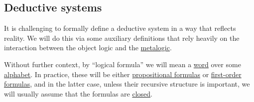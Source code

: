 \subsection{Deductive systems}\label{subsec:deductive_systems}

It is challenging to formally define a deductive system in a way that reflects reality. We will do this via some auxiliary definitions that rely heavily on the interaction between the object logic and the \hyperref[rem:metalogic]{metalogic}.

Without further context, by \enquote{logical formula} we will mean a \hyperref[def:formal_language/word]{word} over some \hyperref[def:formal_language]{alphabet}. In practice, these will be either \hyperref[def:propositional_syntax/formula]{propositional formulas} or \hyperref[def:first_order_syntax/formula]{first-order formulas}, and in the latter case, unless their recursive structure is important, we will usually assume that the formulas are \hyperref[def:first_order_syntax/closed_formula]{closed}.

